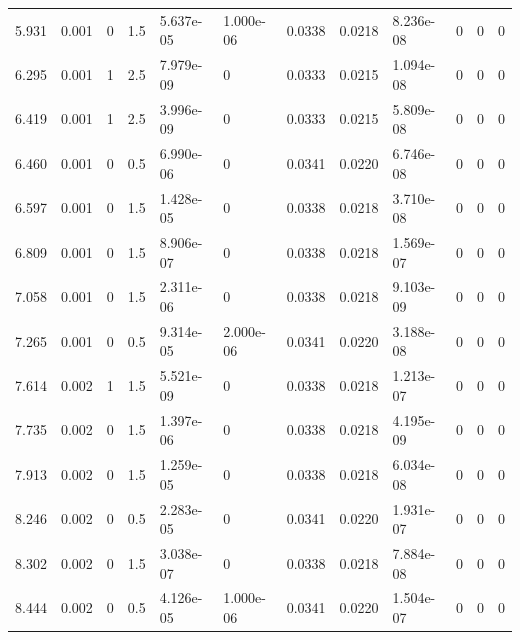 \documentclass[preview]{standalone}
\begin{document}
{{\begin{tabular}{L{1.2cm}C{1.2cm} C{0.3cm}C{0.5cm} C{1.4cm}C{1.4cm} C{1.4cm}C{1.4cm} C{1.6cm}C{1.6cm} C{1.6cm}C{1.6cm}}
  5.931  &  0.001  & 0     & 1.5 &  5.637e-05  & 1.000e-06  &  0.0338&   0.0218& 8.236e-08 & 0   &  0 & 0  \\ 
  6.295  &  0.001  & 1     & 2.5 &  7.979e-09  & 0  &  0.0333&   0.0215& 1.094e-08 & 0   &  0 & 0  \\ 
  6.419  &  0.001  & 1     & 2.5 &  3.996e-09  & 0  &  0.0333&   0.0215& 5.809e-08 & 0   &  0 & 0  \\ 
  6.460  &  0.001  & 0     & 0.5 &  6.990e-06  & 0  &  0.0341&   0.0220& 6.746e-08 & 0   &  0 & 0  \\ 
  6.597  &  0.001  & 0     & 1.5 &  1.428e-05  & 0  &  0.0338&   0.0218& 3.710e-08 & 0   &  0 & 0  \\ 
  6.809  &  0.001  & 0     & 1.5 &  8.906e-07  & 0  &  0.0338&   0.0218& 1.569e-07 & 0   &  0 & 0  \\ 
  7.058  &  0.001  & 0     & 1.5 &  2.311e-06  & 0  &  0.0338&   0.0218& 9.103e-09 & 0   &  0 & 0  \\ 
  7.265  &  0.001  & 0     & 0.5 &  9.314e-05  & 2.000e-06  &  0.0341&   0.0220& 3.188e-08 & 0   &  0 & 0  \\ 
  7.614  &  0.002  & 1     & 1.5 &  5.521e-09  & 0  &  0.0338&   0.0218& 1.213e-07 & 0   &  0 & 0  \\ 
  7.735  &  0.002  & 0     & 1.5 &  1.397e-06  & 0  &  0.0338&   0.0218& 4.195e-09 & 0   &  0 & 0  \\ 
  7.913  &  0.002  & 0     & 1.5 &  1.259e-05  & 0  &  0.0338&   0.0218& 6.034e-08 & 0   &  0 & 0  \\ 
  8.246  &  0.002  & 0     & 0.5 &  2.283e-05  & 0  &  0.0341&   0.0220& 1.931e-07 & 0   &  0 & 0  \\ 
  8.302  &  0.002  & 0     & 1.5 &  3.038e-07  & 0  &  0.0338&   0.0218& 7.884e-08 & 0   &  0 & 0  \\ 
  8.444  &  0.002  & 0     & 0.5 &  4.126e-05  & 1.000e-06  &  0.0341&   0.0220& 1.504e-07 & 0   &  0 & 0  \\ 
\hline 
\end{tabular} 

}}
\end{document}
